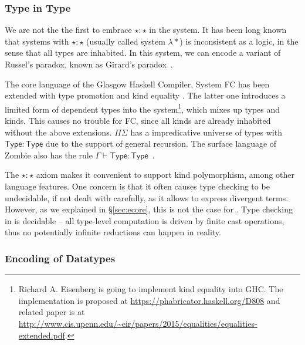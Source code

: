\subsubsection{Type in Type}

We are not the the first to embrace $\star : \star$ in the system. It has been long known that systems with $\star : \star$ (usually called system $\lambda *$) is inconsistent as a logic, in the sense that all types are inhabited. In this system, we can encode a variant of Russel's paradox, known as Girard's paradox~\cite{coquand1986analysis}.

The core language of the Glasgow Haskell Compiler, System FC \cite{fc} has been extended with type promotion \cite{fc:pro} and kind equality \cite{fc:kind}. The latter one introduces a limited form of dependent types into the system\footnote{Richard A. Eisenberg is going to implement kind equality \cite{fc:kind} into GHC. The implementation is proposed at \url{https://phabricator.haskell.org/D808} and related paper is at \url{http://www.cis.upenn.edu/~eir/papers/2015/equalities/equalities-extended.pdf}.}, which mixes up types and kinds. This causes no trouble for FC, since all kinds are already inhabited without the above extensions. $\Pi\Sigma$ has a impredicative universe of types with $\mathsf{Type} : \mathsf{Type}$ due to the support of general recursion. The surface language of Zombie also has the rule $\Gamma \vdash \mathsf{Type} : \mathsf{Type}$~\cite{zombie:popl15}.

The $\star : \star$ axiom makes it convenient to support kind polymorphism, among other language features. One concern is that it often causes type checking to be undecidable, if not dealt with carefully, as it allows to express divergent terms. However, as we explained in \S\ref{sec:ecore}, this is not the case for \name. Type checking in \name is decidable -- all type-level computation is driven by finite cast operations, thus no potentially infinite reductions can happen in reality.

\subsubsection{Encoding of Datatypes}

